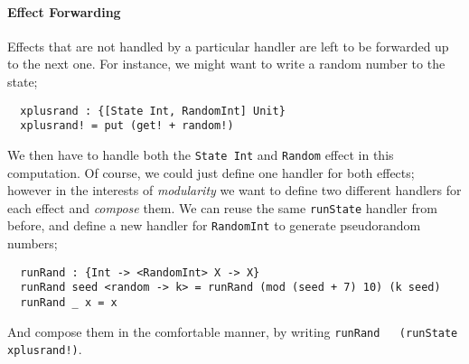 \documentclass[msc,deptreport,cs]{infthesis} %
\newcommand{\code}[1]{\lstinline{#1}}
\begin{document}


\paragraph*{Effect Forwarding}

Effects that are not handled by a particular handler are left to be forwarded up
to the next one. For instance, we might want to write a random number to the
state;

\begin{lstlisting}
  xplusrand : {[State Int, RandomInt] Unit}
  xplusrand! = put (get! + random!)
\end{lstlisting}

\noindent We then have to handle both the \code{State Int} and \code{Random}
effect in this computation. Of course, we could just define one handler for both
effects; however in the interests of \emph{modularity} we want to define two
different handlers for each effect and \emph{compose} them. We can reuse the
same \code{runState} handler from before, and define a new handler for
\code{RandomInt} to generate pseudorandom numbers;

\begin{lstlisting}
  runRand : {Int -> <RandomInt> X -> X}
  runRand seed <random -> k> = runRand (mod (seed + 7) 10) (k seed)
  runRand _ x = x
\end{lstlisting}

\noindent And compose them in the comfortable manner, by writing \code{runRand
  (runState xplusrand!)}.

\end{document}
